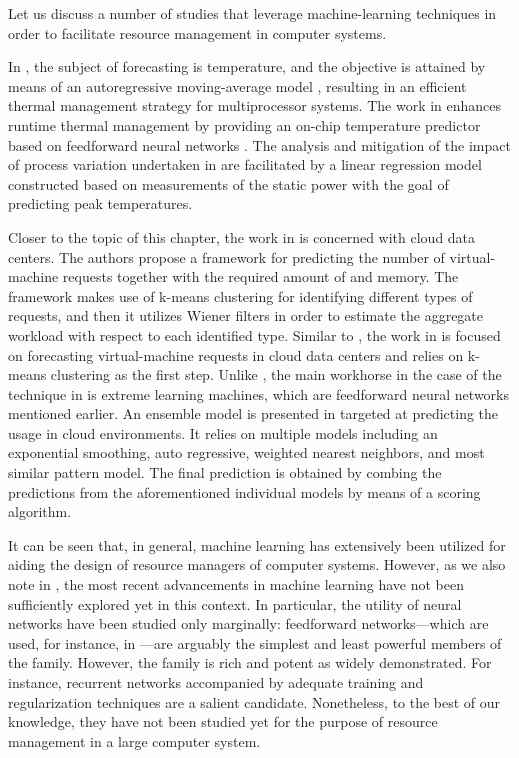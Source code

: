 Let us discuss a number of studies that leverage machine-learning techniques in
order to facilitate resource management in computer systems.

In \cite{coskun2008}, the subject of forecasting is temperature, and the
objective is attained by means of an autoregressive moving-average model
\cite{hastie2013}, resulting in an efficient thermal management strategy for
multiprocessor systems. The work in \cite{kumar2010} enhances runtime thermal
management by providing an on-chip temperature predictor based on feedforward
neural networks \cite{hastie2013}. The analysis and mitigation of the impact of
process variation undertaken in \cite{juan2014} are facilitated by a linear
regression model \cite{hastie2013} constructed based on measurements of the
static power with the goal of predicting peak temperatures.

Closer to the topic of this chapter, the work in \cite{dabbagh2015} is concerned
with cloud data centers. The authors propose a framework for predicting the
number of virtual-machine requests together with the required amount of 
and memory. The framework makes use of k-means clustering \cite{hastie2013} for
identifying different types of requests, and then it utilizes Wiener filters in
order to estimate the aggregate workload with respect to each identified type.
Similar to \cite{dabbagh2015}, the work in \cite{ismaeel2015} is focused on
forecasting virtual-machine requests in cloud data centers and relies on k-means
clustering as the first step. Unlike \cite{dabbagh2015}, the main workhorse in
the case of the technique in \cite{ismaeel2015} is extreme learning machines,
which are feedforward neural networks mentioned earlier. An ensemble model
\cite{hastie2013} is presented in \cite{cao2014} targeted at predicting the
 usage in cloud environments. It relies on multiple models including an
exponential smoothing, auto regressive, weighted nearest neighbors, and most
similar pattern model. The final prediction is obtained by combing the
predictions from the aforementioned individual models by means of a scoring
algorithm.

It can be seen that, in general, machine learning has extensively been utilized
for aiding the design of resource managers of computer systems. However, as we
also note in , the most recent advancements in machine
learning have not been sufficiently explored yet in this context. In particular,
the utility of neural networks have been studied only marginally: feedforward
networks---which are used, for instance, in \cite{kumar2010, ismaeel2015}---are
arguably the simplest and least powerful members of the family. However, the
family is rich and potent as widely demonstrated. For instance, recurrent
networks accompanied by adequate training and regularization techniques
\cite{goodfellow2016} are a salient candidate. Nonetheless, to the best of our
knowledge, they have not been studied yet for the purpose of resource management
in a large computer system.

